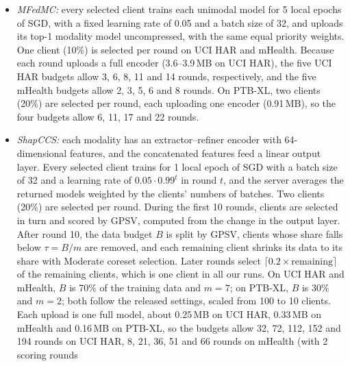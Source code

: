 \documentclass[sigconf]{acmart}
\newcommand{\method}{Hybrid}   %
\begin{document}
\begin{itemize}
  round and upload a sketch of their full-batch gradient for 85 rounds. On UCI
  HAR, the sketch has 3 rows and its width grows with the budget, from 1,000
  columns at 10\,MB to 5,000 at 50\,MB (1,000 columns per 10\,MB). On mHealth,
  it runs 42 rounds and its sketch grows from $3\times1{,}000$ at 5\,MB to
  $3\times5{,}000$ at 25\,MB (1,000 columns per 5\,MB). On PTB-XL, its sketch grows
  from $3\times2{,}000$ at 10\,MB to $3\times5{,}000$ at 40\,MB, for 42, 56, 63
  and 68 rounds, respectively. It uses the same $k$,
  momentum and error feedback as \method.
  \item \textit{MFedMC:} every selected client trains each unimodal model for
  5 local epochs of SGD, with a fixed learning rate of 0.05 and a batch size of
  32, and uploads its top-1 modality model uncompressed, with the same equal
  priority weights. One client (10\%) is selected per round on UCI HAR and
  mHealth. Because each round uploads a full encoder (3.6--3.9\,MB on UCI HAR),
  the five UCI HAR budgets allow 3, 6, 8, 11 and 14 rounds, respectively, and the
  five mHealth budgets allow 2, 3, 5, 6 and 8 rounds. On PTB-XL,
  two clients (20\%) are selected per round, each uploading one encoder
  (0.91\,MB), so the four budgets allow 6, 11, 17 and 22 rounds.
  \item \textit{ShapCCS:} each modality has an extractor--refiner encoder
  with 64-dimensional features, and the concatenated features feed a linear
  output layer. Every selected client trains for 1 local epoch of SGD with a
  batch size of 32 and a learning rate of $0.05\cdot0.99^{t}$ in round $t$, and
  the server averages the returned models weighted by the clients' numbers of
  batches. Two clients (20\%) are selected per round. During the first 10
  rounds, clients are selected in turn and scored by GPSV, computed from the
  change in the output layer. After round 10, the data budget $B$ is split by
  GPSV, clients whose share falls below $\tau = B/m$ are removed, and each
  remaining client shrinks its data to its share with Moderate coreset
  selection. Later rounds select $\lceil 0.2\times\text{remaining}\rceil$ of the
  remaining clients, which is one client in all our runs. On UCI HAR and mHealth,
  $B$ is 70\% of the training data and $m = 7$; on PTB-XL, $B$ is 30\% and
  $m = 2$; both follow the released settings, scaled from 100 to 10 clients.
  Each upload is one full model, about 0.25\,MB on UCI HAR, 0.33\,MB on mHealth
  and 0.16\,MB on PTB-XL, so the budgets allow 32, 72, 112, 152 and 194 rounds
  on UCI HAR, 8, 21, 36, 51 and 66 rounds on mHealth (with 2 scoring rounds

\end{itemize}
\end{document}
